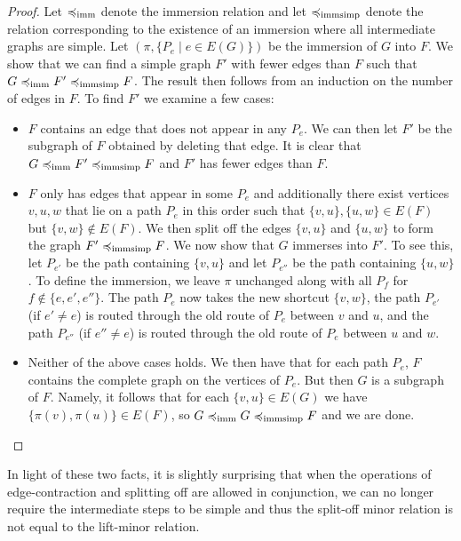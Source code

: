 \documentclass[11pt]{article}
\begin{document}
\begin{proof}
    Let $\preccurlyeq_{\text{imm}}$ denote the immersion relation and let $\preccurlyeq_{\text{immsimp}}$ denote the relation corresponding to the existence of an immersion where all intermediate graphs are simple.
    Let $(\pi, \{P_e \mid e \in E(G)\})$ be the immersion of $G$ into $F$. 
    We show that we can find a simple graph $F'$ with fewer edges than $F$ such that $G \preccurlyeq_{\text{imm}} F' \preccurlyeq_{\text{immsimp}} F$. The result then follows from an induction on the number of edges in $F$.
    To find $F'$ we examine a few cases:
    \begin{itemize}
        \item $F$ contains an edge that does not appear in any $P_e$. We can then let $F'$ be the subgraph of $F$ obtained by deleting that edge. It is clear that $G \preccurlyeq_{\text{imm}} F' \preccurlyeq_{\text{immsimp}} F$ and $F'$ has fewer edges than $F$.

        \item $F$ only has edges that appear in some $P_e$ and additionally there exist vertices $v,u,w$ that lie on a path $P_e$ in this order such that $\{v,u\}, \{u,w\} \in E(F)$ but $\{v,w\} \notin E(F)$.
        We then split off the edges $\{v,u\}$ and $\{u,w\}$ to form the graph $F'\preccurlyeq_{\text{immsimp}} F$. We now show that $G$ immerses into $F'$. To see this, let $P_{e'}$ be the path containing $\{v,u\}$ and let $P_{e''}$ be the path containing $\{u,w\}$. To define the immersion, we leave $\pi$ unchanged along with all $P_f$ for $f \notin \{e,e', e''\}$. The path $P_e$ now takes the new shortcut $\{v,w\}$, the path $P_{e'}$ (if $e' \neq e$) is routed through the old route of $P_e$ between $v$ and $u$, and the path $P_{e''}$ (if $e'' \neq e$) is routed through the old route of $P_e$ between $u$ and $w$.

        \item Neither of the above cases holds. We then have that for each path $P_e$, $F$ contains the complete graph on the vertices of $P_e$. But then $G$ is a subgraph of $F$. Namely, it follows that for each $\{v,u\} \in E(G)$ we have $\{\pi(v), \pi(u)\} \in E(F)$, so $G \preccurlyeq_{\text{imm}} G \preccurlyeq_{\text{immsimp}} F$ and we are done.
    \end{itemize}
\end{proof}

In light of these two facts, it is slightly surprising that when the operations of edge-contraction and splitting off are allowed in conjunction, we can no longer require the intermediate steps to be simple and thus the split-off minor relation is not equal to the lift-minor relation.
\end{document}
